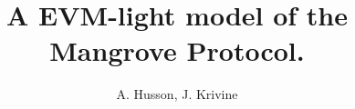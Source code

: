\documentclass[12pt]{extarticle}
\begin{document}
\title{A EVM-light model of the Mangrove Protocol.}
\author{A. Husson, J. Krivine}
\date{}
\maketitle

\def\Op{\mathsf{Op}}
\def\call#1{\mathtt{call}(#1)}
\def\dcall#1{\mathtt{dcall}(#1)}
\def\sstore#1{\mathtt{sstore}(#1)}
\def\sload#1{\mathtt{sload}(#1)}
\def\brd{\mathtt{rdata}}
\def\bcd{\mathtt{cdata}}
\def\hsh#1{\mathtt{hash}(#1)}
\def\return#1{\mathtt{return}(#1)}
\def\revert#1{\mathtt{revert}(#1)}
\def\switch#1{\mathtt{if}(#1)}
\def\while#1{\mathtt{while}(#1)}

\def\Nat{\mathbb{N}}
\def\Uint{\mathbb{U}}
\def\Bool{\mathbb{B}}
\def\Addr{\mathbb{A}}
\def\Str{\mathbb{S}}
\def\str#1{\hbox{\rm\texttt{"#1"}}}
\def\ary#1{\left[{#1}\right]}
\def\z{\mathbf{0}}
\def\zMem{\z_\memory}
\def\zArray{[]}
\def\zStore{\z_\textit{store}}
\def\zBytecode{\z_{\texttt{B}}}


\def\Ctr{\mathsf{Ctr}}
\def\Abi{\textit{ABI}}
\def\Block{\mathbf{S}}
\def\tx{\mathsf{tx}}
\def\transactions{\textit{Transactions}}
\def\ctx{\mathsf{Ctx}}

\def\thisVar{\texttt{this}}
\def\thisVal{\textit{this}}

\def\stateVal{\textit{state}}

\newcommand{\initStep}[3]{\mathsf{Step}^{#1}_{#2.#3}}

\def\senderVar{\texttt{sender}}
\def\senderVal{\textit{sender}}

\def\returnDataVal{\textit{returndata}}
\def\dataVal{\textit{data}}
\def\returnDataVar{\texttt{returndata}}
\def\gasleftVal{\textit{gasleft}}
\def\gas{\textit{gas}}
\def\gasleftVar{\texttt{gasleft}}
\def\originVal{\textit{origin}}
\def\toVal{\textit{to}}
\def\fnVal{\textit{fn}}
\def\gasVal{\textit{gas}}
\def\cd{\chi}
\def\callDataVar{\texttt{calldata}}
\def\callDataVal{\textit{calldata}}
\def\memory{\textit{mem}}
\def\step{\mathsf{Step}}
\def\steps{\textit{Steps}}
\def\endStep{\mathsf{End}}
\def\continuation#1{\textit{continuation}(#1)}
\def\instruction#1{\textit{instruction}(#1)}

\def\Byt{\mathtt{B}}

\def\Exec{\mathbf{E}}
\def\rlab#1{\;\mathtt{#1}}
\def\llab#1{\mathtt{#1}\;}
\def\comp{\mathrel{\|}}
\def\Pending{\mathsf{Pending}}
\def\Def{\mathsf{Def}}
\def\require{\texttt{require}}
\def\Revert{\mathit{Revert}}
\def\rar{\dashrightarrow}
\end{document}
